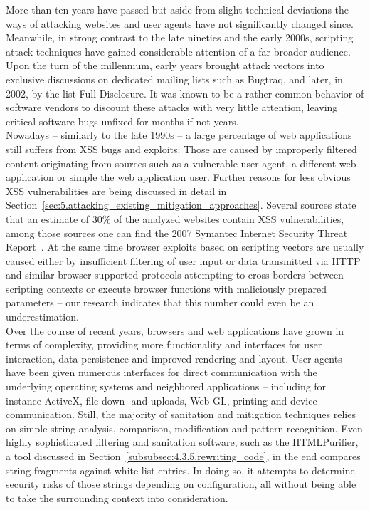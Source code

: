   More than ten years have passed but aside from slight technical deviations the ways of attacking websites and user agents have not significantly changed since. Meanwhile, in strong contrast to the late nineties and the early 2000s, scripting attack techniques have gained considerable attention of a far broader audience. Upon the turn of the millennium, early years brought attack vectors into exclusive discussions on dedicated mailing lists such as Bugtraq, and later, in 2002, by the list Full Disclosure\cite{bugtraq_bugtraq:_1999,full_disclosure_full_2002}. It was known to be a rather common behavior of software vendors to discount these attacks with very little attention, leaving critical software bugs unfixed for months if not years\cite{reavis_csoinformer_2000}.\\

  Nowadays -- similarly to the late 1990s -- a large percentage of web applications still suffers from XSS bugs and exploits: Those are caused by improperly filtered content originating from sources such as a vulnerable user agent, a different web application or simple the web application user. Further reasons for less obvious XSS vulnerabilities are being discussed in detail in Section~\ref{sec:5.attacking_existing_mitigation_approaches}. Several sources state that an estimate of 30\% of the analyzed websites contain XSS vulnerabilities, among those sources one can find the 2007 Symantec Internet Security Threat Report~\cite{turner_symantec_2008}. At the same time browser exploits based on scripting vectors are usually caused either by insufficient filtering of user input or data transmitted via HTTP and similar browser supported protocols attempting to cross borders between scripting contexts or execute browser functions with maliciously prepared parameters -- our research indicates that this number could even be an underestimation.\\

  Over the course of recent years, browsers and web applications have grown in terms of complexity, providing more functionality and interfaces for user interaction, data persistence and improved rendering and layout. User agents have been given numerous interfaces for direct communication with the underlying operating systems and neighbored applications -- including for instance ActiveX, file down- and uploads, Web GL, printing and device communication. Still, the majority of sanitation and mitigation techniques relies on simple string analysis, comparison, modification and pattern recognition. Even highly sophisticated filtering and sanitation software, such as the HTMLPurifier, a tool discussed in Section~\ref{subsubsec:4.3.5.rewriting_code}, in the end compares string fragments against white-list entries. In doing so, it attempts to determine security risks of those strings depending on configuration, all without being able to take the surrounding context into consideration.\\

